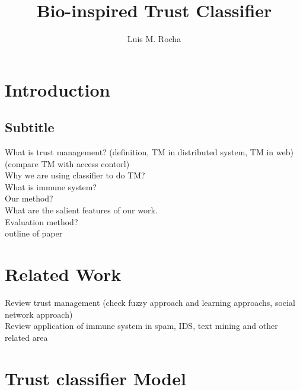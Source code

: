 \documentclass{llncs}
\begin{document}
\title{Bio-inspired Trust Classifier}
\author{Luis M. Rocha}

%
%
\maketitle






\section{Introduction}

\subsection{Subtitle}

 
What is trust management?
(definition,  TM in distributed system,  TM in web)\\
(compare TM with access contorl)\\
Why we are using classifier to do TM?\\
What is immune system?\\
Our method?\\
What are the salient features of our work.\\
Evaluation method? \\
outline of paper




\section{Related Work}


Review trust management (check fuzzy approach and learning approachs, social network approach)\\
Review application of  immune system in spam, IDS, text mining and other related area


\section{Trust classifier Model }
\end{document}

